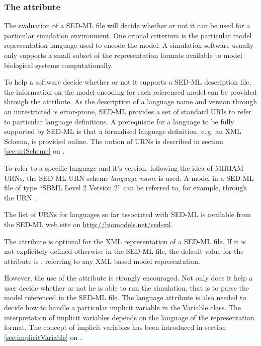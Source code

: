 \subsubsection{The  attribute}
\label{sec:language}
The evaluation of a SED-ML file will decide whether or not it can be used for a particular simulation environment. One crucial criterium is the particular model representation language used to encode the model. A simulation software usually only supports a small subset of the representation formats available to model biological systems computationally. 

To help a software decide whether or not it supports a SED-ML description file, the information on the model encoding for each referenced model can be provided through the  attribute. 
As the description of a language name and version through an unrestricted  is error-prone, SED-ML provides a set of standard URIs to refer to particular language definitions. A prerequisite for a language to be fully supported by SED-ML is that a formalised language definition, e.\,g. an XML Schema, is provided online. The notion of URNs is described in section \ref{sec:uriScheme} on . 

To refer to a specific language and it's version, following the idea of MIRIAM URNs, the SED-ML URN scheme \emph{language name} is used. A model in a SED-ML file of type ``SBML Level 2 Version 2'' can be referred to, for example, through the URN .

The list of URNs for languages so far associated with SED-ML is available from the SED-ML web site on \url{http://biomodels.net/sed-ml}. 

The  attribute is optional for the XML representation of a SED-ML file. If it is not explicitely defined otherwise in the SED-ML file, the default value for the  attribute is , referring to any XML based model representation. 

However, the use of the  attribute is strongly encouraged. Not only does it help a user decide whether or not he is able to run the simulation, that is to parse the model referenced in the SED-ML file. The language attribute is also needed to decide how to handle a particular implicit variable in the \hyperref[class:variable]{Variable} class. The interpretation of implicit variables depends on the language of the representation format. The concept of implicit variables has been introduced in section \ref{sec:implicitVariable} on  .


